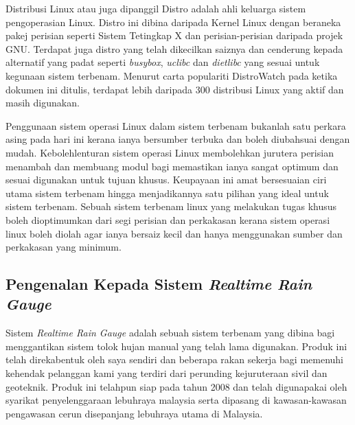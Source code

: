 Distribusi Linux atau juga dipanggil Distro adalah ahli keluarga sistem pengoperasian Linux. Distro ini dibina daripada Kernel Linux dengan beraneka pakej perisian seperti Sistem Tetingkap X dan perisian-perisian daripada projek GNU. Terdapat juga distro yang telah dikecilkan saiznya dan cenderung kepada alternatif yang padat seperti \textit{busybox}, \textit{uclibc} dan \textit{dietlibc} yang sesuai untuk kegunaan sistem terbenam. Menurut carta populariti DistroWatch\cite{w3} pada ketika dokumen ini ditulis, terdapat lebih daripada 300 distribusi Linux yang aktif dan masih digunakan.

Penggunaan sistem operasi Linux dalam sistem terbenam bukanlah satu perkara asing pada hari ini kerana ianya bersumber terbuka dan boleh diubahsuai dengan mudah. Kebolehlenturan sistem operasi Linux membolehkan jurutera perisian menambah dan membuang modul bagi memastikan ianya sangat optimum dan sesuai digunakan untuk tujuan khusus. Keupayaan ini amat bersesuaian ciri utama sistem terbenam hingga menjadikannya satu pilihan yang ideal untuk sistem terbenam. Sebuah sistem terbenam linux yang melakukan tugas khusus boleh dioptimumkan dari segi perisian dan perkakasan kerana sistem operasi linux boleh diolah agar ianya bersaiz kecil dan hanya menggunakan sumber dan perkakasan yang minimum.

\subsection{Pengenalan Kepada Sistem \textit{Realtime Rain Gauge}}%
Sistem \textit{Realtime Rain Gauge} adalah sebuah sistem terbenam yang dibina bagi menggantikan sistem tolok hujan manual yang telah lama digunakan. Produk ini telah direkabentuk oleh saya sendiri dan beberapa rakan sekerja bagi memenuhi kehendak pelanggan kami yang terdiri dari perunding kejuruteraan sivil dan geoteknik. Produk ini telahpun siap pada tahun 2008 dan telah digunapakai oleh syarikat penyelenggaraan lebuhraya malaysia serta dipasang di kawasan-kawasan pengawasan cerun disepanjang lebuhraya utama di Malaysia.

